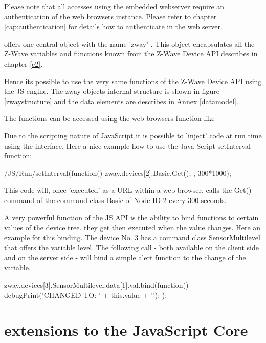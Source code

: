 Please note that all accesses using the embedded webserver require an authentication of the 
web browsers instance. Please refer to chapter \ref{cap:authentication} for details how to 
authenticate in the \zway web server.

\zway offers one central object with the name 'zway' . This object encapsulates all the 
Z-Wave variables and functions known from the Z-Wave Device API describes in chapter \ref{c2}.

Hence its possible to use the very same functions of the Z-Wave Device API using the JS
engine. The zway objects internal structure is shown in figure \ref{zwaystructure} and the data elements 
are describes in Annex \ref{datamodel}.

The functions can be accessed using the web browsers function like


Due to the scripting nature of JavaScript it is possible to 'inject' code at run time
using the interface. Here a nice example how to use the Java Script 
setInterval function:

\begin{listingverbatim}
/JS/Run/setInterval(function() { 
	zway.devices[2].Basic.Get();
}, 300*1000);
\end{listingverbatim}

This code will, once 'executed' as a URL within a web browser, calls the Get() command
of the command class Basic of Node ID 2 every 300 seconds.  

A very powerful function of the JS API is the ability to bind functions to certain
values of the device tree. they get then executed when the value changes. Here an 
example for this binding. The device No. 3 has a command class SensorMultilevel that offers
the variable level. The following call - both available on the client side 
and on the server side - will bind a simple alert function to the change of 
the variable.

\begin{listingverbatim}
zway.devices[3].SensorMultilevel.data[1].val.bind(function() { 
	debugPrint('CHANGED TO: ' + this.value + '\n'); 
});  
\end{listingverbatim}



\section{\zway extensions to the JavaScript Core}

